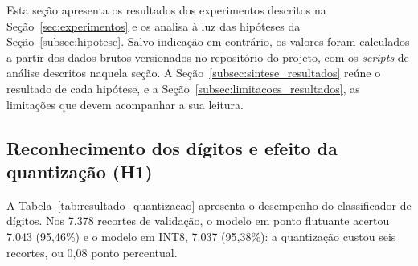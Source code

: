 Esta seção apresenta os resultados dos experimentos descritos na
Seção~\ref{sec:experimentos} e os analisa à luz das hipóteses da
Seção~\ref{subsec:hipotese}. Salvo indicação em contrário, os valores foram calculados a
partir dos dados brutos versionados no repositório do projeto, com os \textit{scripts} de
análise descritos naquela seção. A Seção~\ref{subsec:sintese_resultados} reúne o resultado
de cada hipótese, e a Seção~\ref{subsec:limitacoes_resultados}, as limitações que devem
acompanhar a sua leitura.

\subsection{Reconhecimento dos dígitos e efeito da quantização (H1)}
\label{subsec:resultado_h1}

A Tabela~\ref{tab:resultado_quantizacao} apresenta o desempenho do classificador de
dígitos. Nos 7.378 recortes de validação, o modelo em ponto flutuante acertou 7.043
(95,46\%) e o modelo em INT8, 7.037 (95,38\%): a quantização custou seis recortes, ou
0,08 ponto percentual.

